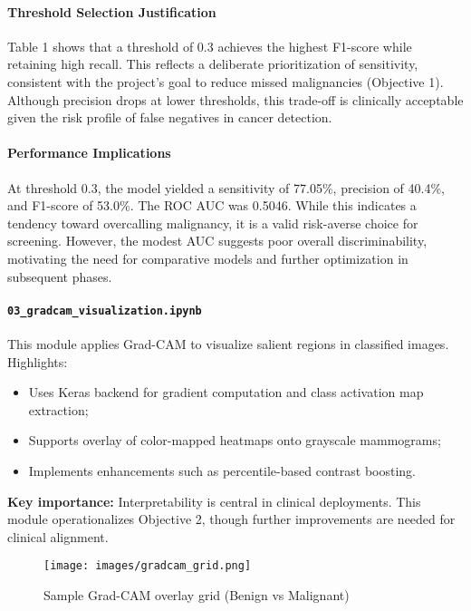 \documentclass[12pt]{article}
\begin{document}
\paragraph{Threshold Selection Justification}
Table 1 shows that a threshold of 0.3 achieves the highest F1-score while retaining high recall. This reflects a deliberate prioritization of sensitivity, consistent with the project’s goal to reduce missed malignancies (Objective 1). Although precision drops at lower thresholds, this trade-off is clinically acceptable given the risk profile of false negatives in cancer detection.

\paragraph{Performance Implications}
At threshold 0.3, the model yielded a sensitivity of 77.05\%, precision of 40.4\%, and F1-score of 53.0\%. The ROC AUC was 0.5046. While this indicates a tendency toward overcalling malignancy, it is a valid risk-averse choice for screening. However, the modest AUC suggests poor overall discriminability, motivating the need for comparative models and further optimization in subsequent phases.

\paragraph{\texttt{03\_gradcam\_visualization.ipynb}}
This module applies Grad-CAM to visualize salient regions in classified images. Highlights:
\begin{itemize}
    \item Uses Keras backend for gradient computation and class activation map extraction;
    \item Supports overlay of color-mapped heatmaps onto grayscale mammograms;
    \item Implements enhancements such as percentile-based contrast boosting.
\end{itemize}

\textbf{Key importance:} Interpretability is central in clinical deployments. This module operationalizes Objective 2, though further improvements are needed for clinical alignment.

\begin{figure}[H]
\centering
\texttt{[image: images/gradcam\_grid.png]}
\caption{Sample Grad-CAM overlay grid (Benign vs Malignant)}
\end{figure}
\end{document}
